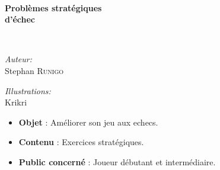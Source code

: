 \begin{titlepage}
%
\begin{center}
\end{center}

\textsc{\Large }\\[0.5cm]

\HRule

\begin{center}
{\huge \bfseries  Problèmes stratégiques\\
d'échec\\[0.4cm] }
\end{center}

\HRule \\[1.5cm]

\begin{minipage}{0.4\textwidth}
\begin{flushleft} \large
\emph{Auteur:}\\
Stephan \textsc{Runigo}
\end{flushleft}
\end{minipage}
\begin{minipage}{0.4\textwidth}
\begin{flushright} \large
\emph{Illustrations:}\\
Krikri
\end{flushright}
\end{minipage}

\vfill

\begin{itemize}[leftmargin=1cm, label=, itemsep=1pt]
\item {\bf Objet} : Améliorer son jeu aux echecs.
\item {\bf Contenu} : Exercices stratégiques.%
\item {\bf Public concerné} : Joueur débutant et intermédiaire.
\end{itemize}

\end{titlepage}
